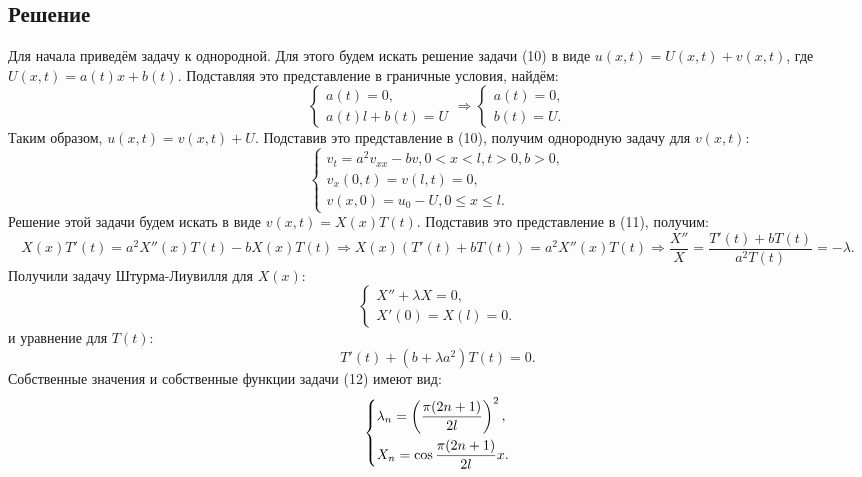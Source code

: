 \documentclass[11pt]{article}
\begin{document}
\subsection{Решение}
\label{sec:orgeb1235d}
Для начала приведём задачу к однородной. Для этого будем искать решение задачи (10) в виде
\(u(x, t) = U(x, t) + v(x, t)\), где \(U(x, t) = a(t)x + b(t)\). Подставляя это представление в
граничные условия, найдём:
\begin{equation*}
\begin{cases}
a(t) = 0, \\
a(t)l + b(t) = U
\end{cases}
\Rightarrow
\begin{cases}
a(t) = 0, \\
b(t) = U.
\end{cases}
\end{equation*}
Таким образом, $u(x, t) = v(x, t) + U$. Подставив это представление в (10), получим однородную
задачу для $v(x, t)$:
\begin{equation}
\begin{cases}
v_t = a^2v_{xx} - bv, 0 < x < l, t > 0, b > 0, \\
v_x(0, t) = v(l, t) = 0, \\
v(x, 0) = u_0 - U, 0 \leq x \leq l.
\end{cases}
\end{equation}
Решение этой задачи будем искать в виде $v(x, t) = X(x)T(t)$. Подставив это представление в (11),
получим:
\begin{equation*}
X(x)T'(t) = a^2X''(x)T(t) - bX(x)T(t) \Rightarrow X(x)(T'(t) + bT(t)) = a^2X''(x)T(t) \Rightarrow
\frac{X''}{X} = \frac{T'(t) + bT(t)}{a^2T(t)} = -\lambda.
\end{equation*}
Получили задачу Штурма-Лиувилля для $X(x)$:
\begin{equation}
\begin{cases}
X'' + \lambda X = 0, \\
X'(0) = X(l) = 0.
\end{cases}
\end{equation}
и уравнение для $T(t)$:
\begin{equation}
T'(t) + (b + \lambda a^2)T(t) = 0.
\end{equation}
Собственные значения и собственные функции задачи (12) имеют вид:
\begin{equation*}
\begin{dcases}
\lambda_n = \left(\frac{\pi(2n + 1)}{2l}\right)^2, \\
X_n = \cos\frac{\pi(2n + 1)}{2l}x.
\end{dcases}
\end{equation*}
\end{document}
